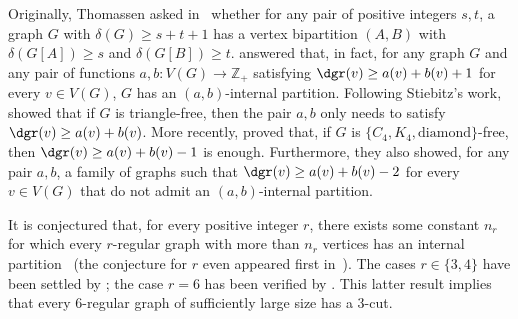 Originally, Thomassen asked in~\citep{internal_partition_thomassen} whether for any pair of positive integers $s,t$, a graph $G$ with $\delta(G) \geq s + t + 1$ has a vertex bipartition $(A,B)$ with $\delta(G[A]) \geq s$ and $\delta(G[B]) \geq t$.
\cite{internal_partition_stiebitz} answered that, in fact, for any graph $G$ and any pair of functions $a,b: V(G) \rightarrow \mathbb{Z}_+$ satisfying $\dgr(v) \geq a(v) + b(v) + 1$ for every $v \in V(G)$, $G$ has an $(a,b)$-internal partition.
Following Stiebitz's work, \cite{internal_partition_triangle_free} showed that if $G$ is triangle-free, then the pair $a,b$ only needs to satisfy $\dgr(v) \geq a(v) + b(v)$.
More recently, \cite{internal_partition_c4_free} proved that, if $G$ is $\{C_4, K_4, \text{diamond}\}$-free, then $\dgr(v) \geq a(v) + b(v) - 1$ is enough.
Furthermore, they also showed, for any pair $a,b$, a family of graphs such that $\dgr(v) \geq a(v) + b(v) - 2$ for every $v \in V(G)$ that do not admit an $(a,b)$-internal partition.

It is conjectured that, for every positive integer $r$, there exists some constant $n_r$ for which every $r$-regular graph with more than $n_r$ vertices has an internal partition~\citep{DeVos09,internal_partition_regular6} (the conjecture for $r$ even appeared first in~\citep{internal_partition_regular3_4}).
The cases $r \in \{3,4\}$ have been settled by \cite{internal_partition_regular3_4}; the case $r=6$ has been verified by \cite{internal_partition_regular6}.
This latter result implies that every 6-regular graph of sufficiently large size has a 3-cut.